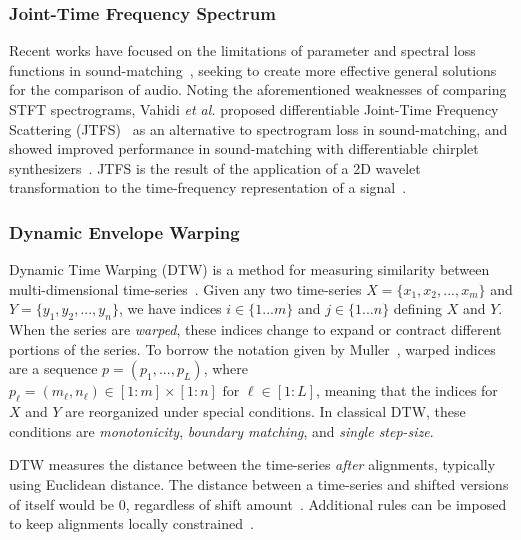 \documentclass[lettersize,journal]{IEEEtran}
\providecommand{\gls}[1]{#1}
\begin{document}
\subsubsection{Joint-Time Frequency Spectrum}
Recent works have focused on the limitations of parameter and spectral loss functions in sound-matching~\cite{vahidi2023mesostructures,uzrad2024diffmoog}, seeking to create more effective general solutions for the comparison of audio. 
Noting the aforementioned weaknesses of comparing STFT spectrograms, Vahidi \textit{et al.} proposed differentiable Joint-Time Frequency Scattering (\gls{JTFS})~\cite{anden2015joint} as an alternative to spectrogram loss in sound-matching, and showed improved performance in sound-matching with differentiable chirplet synthesizers~\cite{vahidi2023mesostructures}. JTFS is the result of the application of a 2D wavelet transformation to the time-frequency representation of a signal~\cite{anden2015joint}. 

\subsubsection{Dynamic Envelope Warping}
Dynamic Time Warping (DTW) is a method for measuring similarity between multi-dimensional time-series~\cite{rabiner1993fundamentals,muller2007dynamic,giorgino2009computing}. Given any two time-series $X = \{x_1,x_2,...,x_m\}$ and $Y = \{y_1,y_2,...,y_n\}$, we have indices $i\in\{1...m\}$ and $j\in\{1...n\}$ defining $X$ and $Y$. When the series are \textit{warped}, these indices change to expand or contract different portions of the series. To borrow the notation given by Muller~\cite{muller2007dynamic}, warped indices are a sequence $p=(p_1,...,p_L)$, where \(p_\ell = (m_\ell, n_\ell) \in [1 : m] \times [1 : n] \text{ for } \ell \in [1 : L]\), meaning that the indices for $X$ and $Y$ are reorganized under special conditions. In classical DTW, these conditions are \textit{monotonicity}, \textit{boundary matching}, and \textit{single step-size}.

DTW measures the distance between the time-series \textit{after} alignments, typically using Euclidean distance. The distance between a time-series and shifted versions of itself would be 0, regardless of shift amount~\cite{tavenard.blog.dtw}. Additional rules can be imposed to keep alignments locally constrained~\cite{itakura1975minimum,sakoe1978dynamic}.
\end{document}
